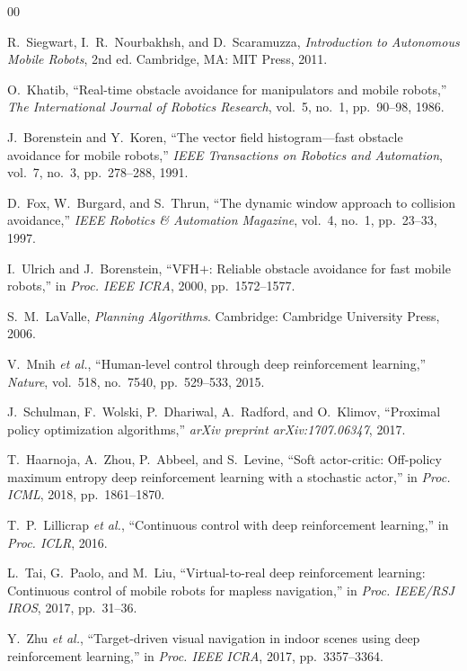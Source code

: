 \documentclass[conference]{IEEEtran}
\begin{document}
\begin{thebibliography}{00}

R.~Siegwart, I.~R.~Nourbakhsh, and D.~Scaramuzza,
\textit{Introduction to Autonomous Mobile Robots}, 2nd ed.
Cambridge, MA: MIT Press, 2011.

O.~Khatib, ``Real-time obstacle avoidance for manipulators and mobile robots,''
\textit{The International Journal of Robotics Research}, vol.~5, no.~1, pp.~90--98, 1986.

J.~Borenstein and Y.~Koren, ``The vector field histogram---fast obstacle avoidance for mobile robots,''
\textit{IEEE Transactions on Robotics and Automation}, vol.~7, no.~3, pp.~278--288, 1991.

D.~Fox, W.~Burgard, and S.~Thrun, ``The dynamic window approach to collision avoidance,''
\textit{IEEE Robotics \& Automation Magazine}, vol.~4, no.~1, pp.~23--33, 1997.

I.~Ulrich and J.~Borenstein, ``VFH$+$: Reliable obstacle avoidance for fast mobile robots,''
in \textit{Proc. IEEE ICRA}, 2000, pp.~1572--1577.

S.~M.~LaValle, \textit{Planning Algorithms}.
Cambridge: Cambridge University Press, 2006.

V.~Mnih \textit{et al.}, ``Human-level control through deep reinforcement learning,''
\textit{Nature}, vol.~518, no.~7540, pp.~529--533, 2015.

J.~Schulman, F.~Wolski, P.~Dhariwal, A.~Radford, and O.~Klimov,
``Proximal policy optimization algorithms,''
\textit{arXiv preprint arXiv:1707.06347}, 2017.

T.~Haarnoja, A.~Zhou, P.~Abbeel, and S.~Levine,
``Soft actor-critic: Off-policy maximum entropy deep reinforcement learning with a stochastic actor,''
in \textit{Proc. ICML}, 2018, pp.~1861--1870.

T.~P.~Lillicrap \textit{et al.}, ``Continuous control with deep reinforcement learning,''
in \textit{Proc. ICLR}, 2016.

L.~Tai, G.~Paolo, and M.~Liu, ``Virtual-to-real deep reinforcement learning: Continuous control of mobile robots for mapless navigation,''
in \textit{Proc. IEEE/RSJ IROS}, 2017, pp.~31--36.

Y.~Zhu \textit{et al.}, ``Target-driven visual navigation in indoor scenes using deep reinforcement learning,''
in \textit{Proc. IEEE ICRA}, 2017, pp.~3357--3364.


\end{thebibliography}
\end{document}
